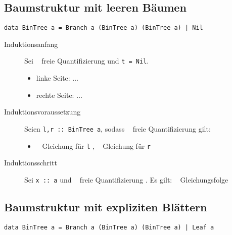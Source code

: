 \documentclass[ngerman, a4paper, 11pt]{article}
\theoremstyle{nonumberplain}
\newcommand*{\enq}[1]{\flq \ \!\!\! #1 \!\!\! \frq}
\begin{document}

\subsection*{Baumstruktur mit leeren Bäumen}
\begin{center}
	\texttt{data BinTree a = Branch a (BinTree a) (BinTree a) | Nil}
\end{center}

\begin{description}
	\item[Induktionsanfang] Sei \enq{freie Quantifizierung} und \texttt{t = Nil}. 
	\begin{itemize}[nolistsep, topsep=-\parskip]
		\item linke Seite: $\dots$
		\item rechte Seite: $\dots$
	\end{itemize}
	\item[Induktionsvoraussetzung] Seien \texttt{l,r :: BinTree a}, sodass \enq{freie Quantifizierung} gilt:
	\begin{itemize}[nolistsep, topsep=-\parskip]
		\item \enq{Gleichung für \texttt{l}} , \enq{Gleichung für \texttt{r}}
	\end{itemize}
	\item[Induktionsschritt] Sei \texttt{x :: a} und \enq{freie Quantifizierung}. Es gilt: \enq{Gleichungsfolge}
\end{description}

\subsection*{Baumstruktur mit expliziten Blättern}
\begin{center}
	\texttt{data BinTree a = Branch a (BinTree a) (BinTree a) | Leaf a}
\end{center}
\end{document}
